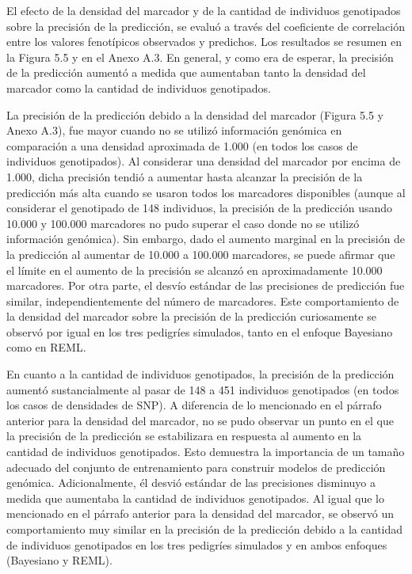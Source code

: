 \documentclass[11pt,spanish,a4paper,oneside,]{book} %
\begin{document}
El efecto de la densidad del marcador y de la cantidad de individuos genotipados sobre la precisión de la predicción, se evaluó a través del coeficiente de correlación entre los valores fenotípicos observados y predichos. Los resultados se resumen en la Figura 5.5 y en el Anexo A.3. En general, y como era de esperar, la precisión de la predicción aumentó a medida que aumentaban tanto la densidad del marcador como la cantidad de individuos genotipados.

La precisión de la predicción debido a la densidad del marcador (Figura 5.5 y Anexo A.3), fue mayor cuando no se utilizó información genómica en comparación a una densidad aproximada de 1.000 (en todos los casos de individuos genotipados). Al considerar una densidad del marcador por encima de 1.000, dicha precisión tendió a aumentar hasta alcanzar la precisión de la predicción más alta cuando se usaron todos los marcadores disponibles (aunque al considerar el genotipado de 148 individuos, la precisión de la predicción usando 10.000 y 100.000 marcadores no pudo superar el caso donde no se utilizó información genómica). Sin embargo, dado el aumento marginal en la precisión de la predicción al aumentar de 10.000 a 100.000 marcadores, se puede afirmar que el límite en el aumento de la precisión se alcanzó en aproximadamente 10.000 marcadores. Por otra parte, el desvío estándar de las precisiones de predicción fue similar, independientemente del número de marcadores. Este comportamiento de la densidad del marcador sobre la precisión de la predicción curiosamente se observó por igual en los tres pedigríes simulados, tanto en el enfoque Bayesiano como en REML.

En cuanto a la cantidad de individuos genotipados, la precisión de la predicción aumentó sustancialmente al pasar de 148 a 451 individuos genotipados (en todos los casos de densidades de SNP). A diferencia de lo mencionado en el párrafo anterior para la densidad del marcador, no se pudo observar un punto en el que la precisión de la predicción se estabilizara en respuesta al aumento en la cantidad de individuos genotipados. Esto demuestra la importancia de un tamaño adecuado del conjunto de entrenamiento para construir modelos de predicción genómica. Adicionalmente, él desvió estándar de las precisiones disminuyo a medida que aumentaba la cantidad de individuos genotipados. Al igual que lo mencionado en el párrafo anterior para la densidad del marcador, se observó un comportamiento muy similar en la precisión de la predicción debido a la cantidad de individuos genotipados en los tres pedigríes simulados y en ambos enfoques (Bayesiano y REML).
\end{document}
